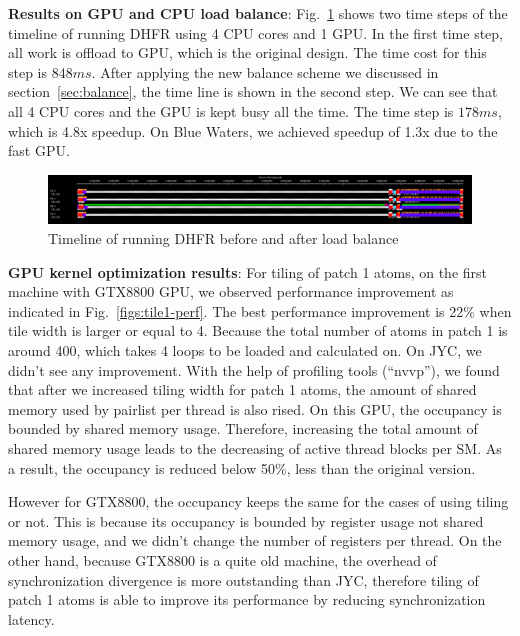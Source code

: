  \textbf{Results on GPU and CPU load balance}: Fig.~\ref{figs:cpu-gpu-balance} 
  shows two time steps of the timeline of running DHFR using 4 CPU cores and 1 GPU. 
  In the first time step, all work is offload to GPU, which is the original design.
  The time cost for this step is $848 ms$. After applying the new balance scheme
  we discussed in section~\ref{sec:balance}, the time line is shown in the second step.
  We can see that all 4 CPU cores and the GPU is kept busy all the time. The time step 
  is $178 ms$, which is 4.8x speedup.
On Blue Waters, we achieved speedup of 1.3x due to the fast GPU.

\begin{figure}[h]
\centering
\includegraphics[width=6.5in]{figs/gpu-cpu-balance-timeline.png}
\caption{Timeline of running DHFR before and after load balance}
\label{figs:cpu-gpu-balance}
\end{figure}

\textbf{GPU kernel optimization results}: For tiling of patch 1 atoms, on the first
machine with GTX8800 GPU, we observed performance improvement as indicated in Fig.~\ref{figs:tile1-perf}.
The best performance improvement is 22\% when tile width is larger or equal to 4. Because the total
number of atoms in patch 1 is around 400, which takes 4 loops to be loaded and calculated on.
On JYC, we didn't see any improvement. With the help of profiling tools (``nvvp''), we found that after we increased tiling width for patch 1 atoms,
the amount of shared memory used by pairlist per thread is also rised. On this GPU, the occupancy is bounded by shared memory usage.
Therefore, increasing the total amount of shared memory usage leads to the decreasing of active thread blocks per SM.
As a result, the occupancy is reduced below 50\%, less than the original version.

However for GTX8800, the occupancy keeps the same for the cases of using tiling or not. This
is because its occupancy is bounded by register usage not shared memory usage, and we didn't change the number of registers per thread.
On the other hand, because GTX8800 is a quite old machine, the overhead of synchronization
divergence is more outstanding than JYC, therefore tiling of patch 1 atoms is able to improve its performance by reducing
synchronization latency.


